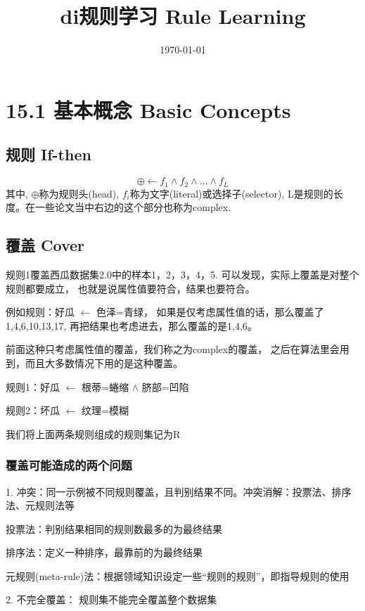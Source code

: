\documentclass[UTF8]{article}
\title{di规则学习 Rule Learning}
\author{}
\date{\today}
\begin{document}
\maketitle
\section{15.1 基本概念 Basic Concepts}
\subsection{规则 If-then}
    \begin{equation}
        \oplus \leftarrow f_1 \wedge f_2 \wedge \dots \wedge f_L
    \end{equation}
    其中, $\oplus$称为规则头(head), $f_i$称为文字(literal)或选择子(selector),
    L是规则的长度。在一些论文当中右边的这个部分也称为complex.

\subsection{覆盖 Cover}
    规则1覆盖西瓜数据集2.0中的样本1，2，3，4，5.
    可以发现，实际上覆盖是对整个规则都要成立，
    也就是说属性值要符合，结果也要符合。

    例如规则：好瓜 $\leftarrow$ 色泽=青绿，
    如果是仅考虑属性值的话，那么覆盖了1,4,6,10,13,17,
    再把结果也考虑进去，那么覆盖的是1,4,6。

    前面这种只考虑属性值的覆盖，我们称之为complex的覆盖，
    之后在算法里会用到，而且大多数情况下用的是这种覆盖。
    
    规则1：好瓜 $\leftarrow$ 根蒂=蜷缩 $\wedge$ 脐部=凹陷
    
    规则2：坏瓜 $\leftarrow$ 纹理=模糊

    我们将上面两条规则组成的规则集记为R

\subsubsection{覆盖可能造成的两个问题}
    1. 冲突：同一示例被不同规则覆盖，且判别结果不同。冲突消解：投票法、排序法、元规则法等  
        
    投票法：判别结果相同的规则数最多的为最终结果

    排序法：定义一种排序，最靠前的为最终结果

    元规则(meta-rule)法：根据领域知识设定一些“规则的规则”，即指导规则的使用
        
    2. 不完全覆盖： 规则集不能完全覆盖整个数据集
\end{document}
